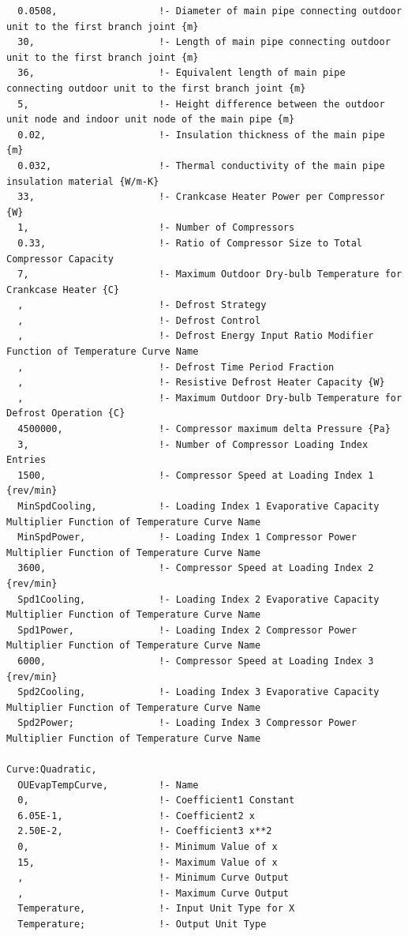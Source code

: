 \begin{lstlisting}
  0.0508,                  !- Diameter of main pipe connecting outdoor unit to the first branch joint {m}
  30,                      !- Length of main pipe connecting outdoor unit to the first branch joint {m}
  36,                      !- Equivalent length of main pipe connecting outdoor unit to the first branch joint {m}
  5,                       !- Height difference between the outdoor unit node and indoor unit node of the main pipe {m}
  0.02,                    !- Insulation thickness of the main pipe {m}
  0.032,                   !- Thermal conductivity of the main pipe insulation material {W/m-K}
  33,                      !- Crankcase Heater Power per Compressor {W}
  1,                       !- Number of Compressors
  0.33,                    !- Ratio of Compressor Size to Total Compressor Capacity
  7,                       !- Maximum Outdoor Dry-bulb Temperature for Crankcase Heater {C}
  ,                        !- Defrost Strategy
  ,                        !- Defrost Control
  ,                        !- Defrost Energy Input Ratio Modifier Function of Temperature Curve Name
  ,                        !- Defrost Time Period Fraction
  ,                        !- Resistive Defrost Heater Capacity {W}
  ,                        !- Maximum Outdoor Dry-bulb Temperature for Defrost Operation {C}
  4500000,                 !- Compressor maximum delta Pressure {Pa}
  3,                       !- Number of Compressor Loading Index Entries
  1500,                    !- Compressor Speed at Loading Index 1 {rev/min}
  MinSpdCooling,           !- Loading Index 1 Evaporative Capacity Multiplier Function of Temperature Curve Name
  MinSpdPower,             !- Loading Index 1 Compressor Power Multiplier Function of Temperature Curve Name
  3600,                    !- Compressor Speed at Loading Index 2 {rev/min}
  Spd1Cooling,             !- Loading Index 2 Evaporative Capacity Multiplier Function of Temperature Curve Name
  Spd1Power,               !- Loading Index 2 Compressor Power Multiplier Function of Temperature Curve Name
  6000,                    !- Compressor Speed at Loading Index 3 {rev/min}
  Spd2Cooling,             !- Loading Index 3 Evaporative Capacity Multiplier Function of Temperature Curve Name
  Spd2Power;               !- Loading Index 3 Compressor Power Multiplier Function of Temperature Curve Name

Curve:Quadratic,
  OUEvapTempCurve,         !- Name
  0,                       !- Coefficient1 Constant
  6.05E-1,                 !- Coefficient2 x
  2.50E-2,                 !- Coefficient3 x**2
  0,                       !- Minimum Value of x
  15,                      !- Maximum Value of x
  ,                        !- Minimum Curve Output
  ,                        !- Maximum Curve Output
  Temperature,             !- Input Unit Type for X
  Temperature;             !- Output Unit Type


\end{lstlisting}
